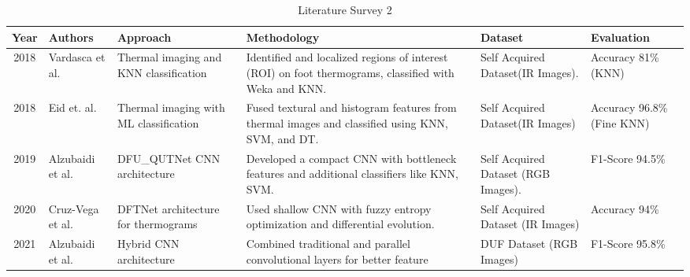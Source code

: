 \begin{table}
    \begin{tabularx}{\linewidth}{|c|X|X|X|X|X|}
    \hline
        \textbf{Year} & \textbf{Authors} & \textbf{Approach} & \textbf{Methodology} & \textbf{Dataset} & \textbf{Evaluation} \\ \hline
        2018 & \cite{Vardasca_2019}{Vardasca et al.} & Thermal imaging and KNN classification & Identified and localized regions of interest (ROI) on foot thermograms, classified with Weka and KNN. & Self Acquired Dataset(IR Images). & Accuracy 81\% (KNN) \\ \hline
        2018 & \cite{Eid2018}{Eid et. al.} & Thermal imaging with ML classification & Fused textural and histogram features from thermal images and classified using KNN, SVM, and DT. & Self Acquired Dataset(IR Images) & Accuracy 96.8\% (Fine KNN) \\ \hline
        2019 & \cite{Alzubaidi_2019}{Alzubaidi et al.} & DFU\_QUTNet CNN architecture & Developed a compact CNN with bottleneck features and additional classifiers like KNN, SVM. & Self Acquired Dataset (RGB Images). & F1-Score 94.5\% \\ \hline
        2020 & \cite{Vega2020}{Cruz-Vega et al.} & DFTNet architecture for thermograms & Used shallow CNN with fuzzy entropy optimization and differential evolution. & Self Acquired Dataset (IR Images) &  Accuracy 94\% \\ \hline
        2021 & \cite{Alzubaidi_2021}{Alzubaidi et al.} & Hybrid CNN architecture & Combined traditional and parallel convolutional layers for better feature & DUF Dataset (RGB Images) & F1-Score 95.8\% \\ \hline
    \end{tabularx}
    \caption {Literature Survey 2}
\end{table}
